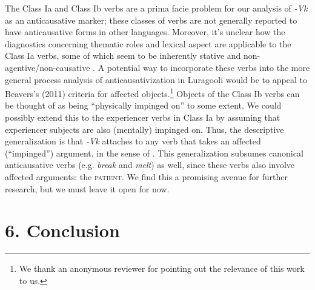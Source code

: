 \documentclass[output=paper]{langsci/langscibook}
\begin{document}
\begin{styleTabellenberschrift}
\begin{styleTabellenberschrift}
The Class Ia and Class Ib verbs are a prima facie problem for our analysis of \textit{{}-Vk} as an anticausative marker; these classes of verbs are not generally reported to have anticausative forms in other languages. Moreover, it’s unclear how the diagnostics concerning thematic roles and lexical aspect are applicable to the Class Ia verbs, some of which seem to be inherently stative and non-agentive/non-causative%
%
. A potential way to incorporate these verbs into the more general process analysis of anticausativization in Luragooli would be to appeal to Beavers’s (2011) criteria for affected objects.\footnote{ We thank an anonymous reviewer for pointing out the relevance of this work to us.}\textsuperscript{ }Objects\textsc{ }of the Class Ib verbs can be thought of as being “physically impinged on” to some extent. We could possibly extend this to the experiencer verbs in Class Ia by assuming that experiencer subjects are also (mentally) impinged on. Thus, the descriptive generalization is that  \textit{{}-Vk} attaches to any verb that takes an affected (“impinged”) argument, in the sense of \citet{Beavers2011}. This generalization subsumes canonical anticausative verbs (e.g. \textit{break} and \textit{melt}) as well, since these verbs also involve affected arguments: the \textsc{patient}. We find this a promising avenue for further research, but we must leave it open for now.

\chapter[6. Conclusion]{6. Conclusion}


\end{styleTabellenberschrift}
\end{styleTabellenberschrift}
\end{document}
